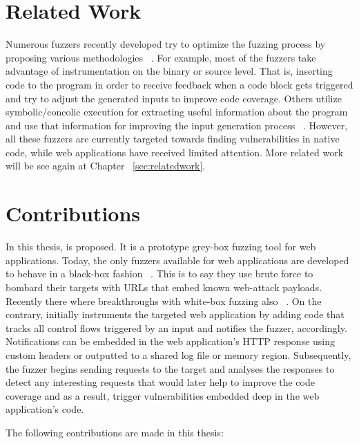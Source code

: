 \section{Related Work}
 Numerous fuzzers recently developed try to optimize the fuzzing process by proposing various methodologies ~\cite{godefroid2012sage, stephens2016driller, rawat2017vuzzer, aschermann2019nautilus, aschermann2019redqueen, hoffman2020Was, osterlund2020parmesan}. For example, most of the fuzzers take advantage of instrumentation on the binary or source level. That is, inserting code to the program in order to receive feedback when a code block gets
triggered and try to adjust the generated inputs to improve code coverage. Others utilize symbolic/concolic execution for extracting useful information about the program and use that information for improving the input generation process ~\cite{stephens2016driller,godefroid2005dart,godefroid2012sage}. However, all these fuzzers are currently targeted towards finding vulnerabilities in native code, while web applications have received limited attention. More related work will be see again at Chapter ~\ref{sec:relatedwork}.

\section{Contributions}
In this thesis, \pname{} is proposed. It is a prototype grey-box fuzzing tool for web applications. Today, the only fuzzers available for web applications are developed to behave in a black-box fashion ~\cite{doupe2010johnny}. This is to say they use brute force to bombard their targets with URLs that embed known web-attack payloads. Recently there where breakthroughs with white-box fuzzing also ~\cite{navex2018,Borges2018BaZINGAWF}. On the contrary, \pname{} initially instruments the targeted web application by adding code that tracks all control flows triggered by an input and notifies the fuzzer, accordingly. Notifications can be embedded in the web application's HTTP response using custom headers or outputted to a shared log file or memory region. Subsequently, the fuzzer begins sending requests to the target and analyses the responses to detect any interesting requests that would later help to improve the code coverage and as a result, trigger vulnerabilities embedded deep in the web application's code.

The following contributions are made in this thesis:

